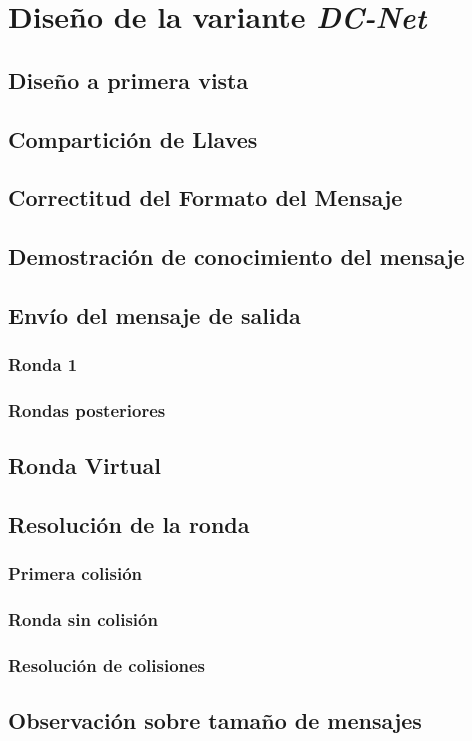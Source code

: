 \chapter{Diseño de la variante \emph{DC-Net}}
\section{Diseño a primera vista}
\section{Compartición de Llaves}
\section{Correctitud del Formato del Mensaje}
\section{Demostración de conocimiento del mensaje}
\section{Envío del mensaje de salida}
\subsection{Ronda 1}
\subsection{Rondas posteriores}
\section{Ronda Virtual}
\section{Resolución de la ronda}
\subsection{Primera colisión}
\subsection{Ronda sin colisión}
\subsection{Resolución de colisiones}
\section{Observación sobre tamaño de mensajes}